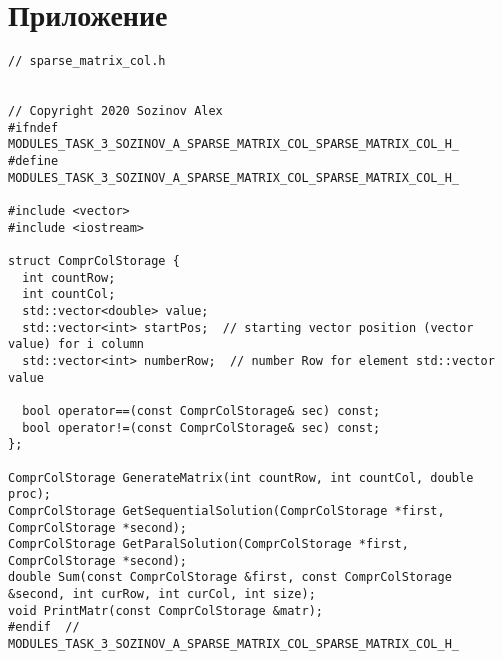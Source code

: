 \documentclass{report}
\begin{document}
\section*{Приложение}
\begin{lstlisting}
// sparse_matrix_col.h


// Copyright 2020 Sozinov Alex
#ifndef MODULES_TASK_3_SOZINOV_A_SPARSE_MATRIX_COL_SPARSE_MATRIX_COL_H_
#define MODULES_TASK_3_SOZINOV_A_SPARSE_MATRIX_COL_SPARSE_MATRIX_COL_H_

#include <vector>
#include <iostream>

struct ComprColStorage {
  int countRow;
  int countCol;
  std::vector<double> value;
  std::vector<int> startPos;  // starting vector position (vector value) for i column
  std::vector<int> numberRow;  // number Row for element std::vector value

  bool operator==(const ComprColStorage& sec) const;
  bool operator!=(const ComprColStorage& sec) const;
};

ComprColStorage GenerateMatrix(int countRow, int countCol, double proc);
ComprColStorage GetSequentialSolution(ComprColStorage *first, ComprColStorage *second);
ComprColStorage GetParalSolution(ComprColStorage *first, ComprColStorage *second);
double Sum(const ComprColStorage &first, const ComprColStorage &second, int curRow, int curCol, int size);
void PrintMatr(const ComprColStorage &matr);
#endif  // MODULES_TASK_3_SOZINOV_A_SPARSE_MATRIX_COL_SPARSE_MATRIX_COL_H_
\end{lstlisting}
\end{document}
